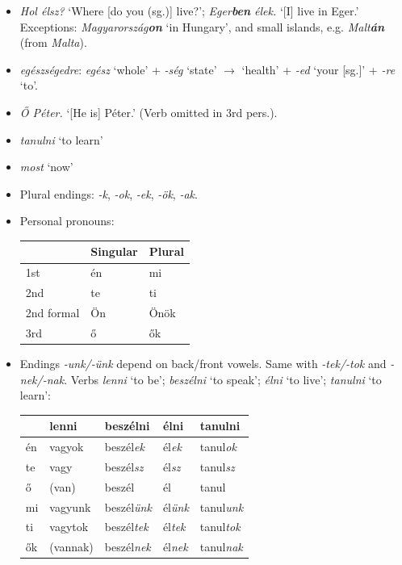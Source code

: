 \documentclass[a4paper,11pt]{article}
\begin{document}
\begin{itemize}
  \item \emph{Hol élsz?} `Where [do you (sg.)] live?';
    \emph{Eger\textbf{ben} élek.} `[I] live in Eger.' Exceptions:
    \emph{Magyarország\textbf{on}} `in Hungary', and small islands,
    e.g. \emph{Malt\textbf{án}} (from \emph{Malta}).

  \item \emph{egészségedre}: \emph{egész} `whole' + \emph{-ség}
    `state' $\rightarrow$ `health' + \emph{-ed} `your [sg.]' +
    \emph{-re} `to'.

  \item \emph{Ő Péter.} `[He is] Péter.' (Verb omitted in 3rd pers.).

  \item \emph{tanulni} `to learn'

  \item \emph{most} `now'

  \item Plural endings: \emph{-k}, \emph{-ok}, \emph{-ek}, \emph{-ök},
    \emph{-ak}.

  \item Personal pronouns:
    \begin{center}
      \begin{tabular}{l|ll}
        & Singular & Plural \\
        \hline
        1st & én & mi \\
        2nd & te & ti \\
        2nd formal & Ön & Önök \\
        3rd & ő  & ők
      \end{tabular}
      \end{center}

  \item Endings \emph{-unk/-ünk} depend on back/front vowels. Same
    with \emph{-tek/-tok} and \emph{-nek/-nak}. Verbs \emph{lenni} `to
    be'; \emph{beszélni} `to speak'; \emph{élni} `to live';
    \emph{tanulni} `to learn':
    \begin{center}
      \begin{tabular}{l|llll}
        & \textbf{lenni} & \textbf{beszélni} & \textbf{élni} &
        \textbf{tanulni} \\
        \hline
        én & vagyok   & beszél\emph{ek}  & él\emph{ek}  & tanul\emph{ok} \\
        te & vagy     & beszél\emph{sz}  & él\emph{sz}  & tanul\emph{sz} \\
        ő  & (van)    & beszél    & él    & tanul \\
        mi & vagyunk  & beszél\emph{ünk} & él\emph{ünk} & tanul\emph{unk} \\
        ti & vagytok  & beszél\emph{tek} & él\emph{tek} & tanul\emph{tok} \\
        ők & (vannak) & beszél\emph{nek} & él\emph{nek} & tanul\emph{nak}
      \end{tabular}
      \end{center}


\end{itemize}
\end{document}
